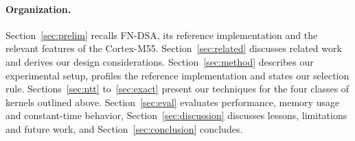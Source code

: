 \paragraph{Organization.}
Section~\ref{sec:prelim} recalls FN-DSA, its reference implementation and
the relevant features of the Cortex-M55.
Section~\ref{sec:related} discusses related work and derives our design
considerations.
Section~\ref{sec:method} describes our experimental setup, profiles the
reference implementation and states our selection rule.
Sections~\ref{sec:ntt} to~\ref{sec:exact} present our techniques for the
four classes of kernels outlined above.
Section~\ref{sec:eval} evaluates performance, memory usage and constant-time
behavior, Section~\ref{sec:discussion} discusses lessons, limitations and
future work, and Section~\ref{sec:conclusion} concludes.
